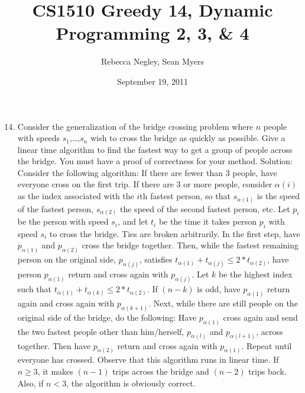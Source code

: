 \documentclass{article}
\title{CS1510 Greedy 14, Dynamic Programming 2, 3, \& 4}
\author{Rebecca Negley, Sean Myers}
\date{September 19, 2011}
\begin{document}
\maketitle

\begin{enumerate}
\setcounter{enumi}{13}
\item Consider the generalization of the bridge crossing problem where $n$ people with speeds $s_1$,\ldots ,$s_n$ wish to cross the bridge as quickly as possible. Give a linear time algorithm to find the fastest way to get a group of people across the bridge. You must have a proof of correctness for your method.
\newline
\newline Solution: Consider the following algorithm:
\newline
\newline If there are fewer than 3 people, have everyone cross on the first trip.
\newline
\newline If there are 3 or more people, consider $\alpha (i)$ as the index associated with the $i$th fastest person, so that $s_{\alpha (1)}$ is the speed of the fastest person, $s_{\alpha (2)}$ the speed of the second fastest person, etc. Let $p_i$ be the person with speed $s_i$, and let $t_i$ be the time it takes person $p_i$ with speed $s_i$ to cross the bridge. Ties are broken arbitrarily. In the first step, have $p_{\alpha (1)}$ and $p_{\alpha (2)}$ cross the bridge together. Then, while the fastest remaining person on the original side, $p_{\alpha (j)}$, satisfies $t_{\alpha (1)}+t_{\alpha (j)}\le 2*t_{\alpha (2)}$, have person $p_{\alpha (1)}$ return and cross again with $p_{\alpha (j)}$. Let $k$ be the highest index such that $t_{\alpha (1)}+t_{\alpha (k)}\le 2*t_{\alpha (2)}$. If $(n-k)$ is odd, have $p_{\alpha (1)}$ return again and cross again with $p_{\alpha (k+1)}$. Next, while there are still people on the original side of the bridge, do the following: Have $p_{\alpha (1)}$ cross again and send the two fastest people other than him/herself, $ p_{\alpha (l)}$ and $p_{\alpha (l+1)}$, across together. Then have $p_{\alpha (2)}$ return and cross again with $p_{\alpha (1)}$. Repeat until everyone has crossed.
\newline
\newline Observe that this algorithm runs in linear time. If $n\ge 3$, it makes $(n-1)$ trips across the bridge and $(n-2)$ trips back. Also, if $n<3$, the algorithm is obviously correct.
\newline

\end{enumerate}
\end{document}
